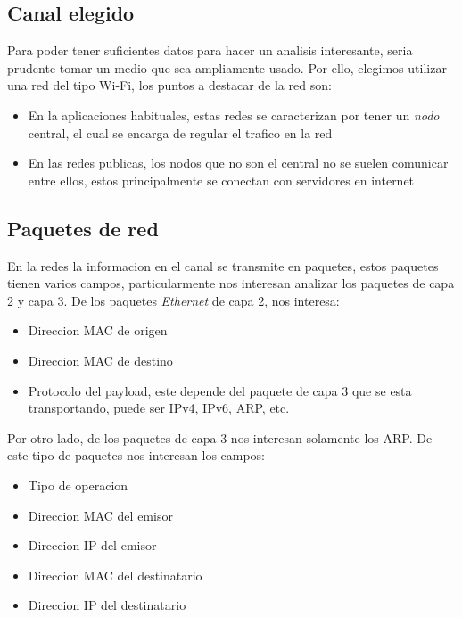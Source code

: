 \subsection{Canal elegido}

Para poder tener suficientes datos para hacer un analisis interesante, seria prudente tomar un medio que sea ampliamente usado. Por ello, elegimos utilizar una red del tipo Wi-Fi, los puntos a destacar de la red son:

\begin{itemize}
	\item En la aplicaciones habituales, estas redes se caracterizan por tener un \textit{nodo} central, el cual se encarga de regular el trafico en la red
	\item En las redes publicas, los nodos que no son el central no se suelen comunicar entre ellos, estos principalmente se conectan con servidores en internet
\end{itemize}

\subsection{Paquetes de red}

En la redes la informacion en el canal se transmite en paquetes, estos paquetes tienen varios campos, particularmente nos interesan analizar los paquetes de capa 2 y capa 3. De los paquetes \textit{Ethernet} de capa 2, nos interesa:

\begin{itemize}
	\item Direccion MAC de origen
	\item Direccion MAC de destino
	\item Protocolo del payload, este depende del paquete de capa 3 que se esta transportando, puede ser IPv4, IPv6, ARP, etc.
\end{itemize}

Por otro lado, de los paquetes de capa 3 nos interesan solamente los ARP. De este tipo de paquetes nos interesan los campos:

\begin{itemize}
	\item Tipo de operacion
	\item Direccion MAC del emisor
	\item Direccion IP del emisor
	\item Direccion MAC del destinatario
	\item Direccion IP del destinatario
\end{itemize}

